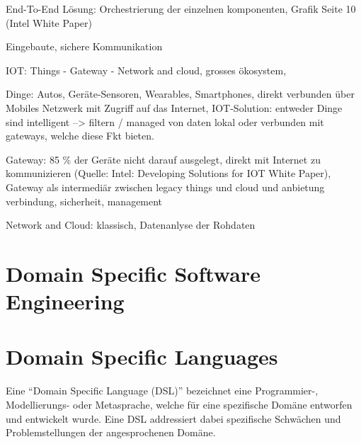 End-To-End Lösung: Orchestrierung der einzelnen komponenten,  Grafik Seite 10 (Intel White Paper)

Eingebaute, sichere Kommunikation

IOT: Things - Gateway - Network and cloud, grosses ökosystem, 

Dinge: Autos, Geräte-Sensoren, Wearables, Smartphones,  direkt verbunden über Mobiles Netzwerk mit Zugriff auf das Internet, IOT-Solution: entweder Dinge sind intelligent --> filtern / managed von daten lokal oder verbunden mit gateways, welche diese Fkt bieten.

Gateway: 85 \% der Geräte nicht darauf ausgelegt, direkt mit Internet zu kommunizieren (Quelle: Intel: Developing Solutions for IOT White Paper), Gateway als intermediär zwischen legacy things und cloud und anbietung verbindung, sicherheit, management

Network and Cloud: klassisch, Datenanlyse der Rohdaten


\section{Domain Specific Software Engineering}


\section{Domain Specific Languages}
Eine "`Domain Specific Language (DSL)"' bezeichnet eine Programmier-, Modellierungs- oder Metasprache, welche für eine spezifische Domäne entworfen und entwickelt wurde. Eine DSL addressiert dabei spezifische Schwächen und Problemstellungen der angesprochenen Domäne.



